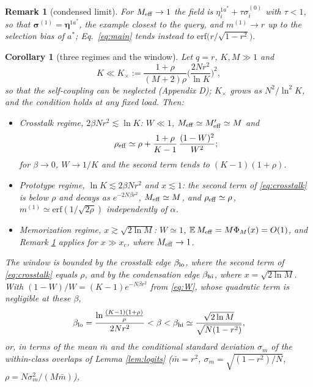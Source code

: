 \documentclass[11pt,a4paper]{article}
\newtheorem{corollary}{Corollary}
\newtheorem{remark}{Remark}
\newcommand{\s}{\bm{\sigma}}
\newcommand{\e}{\bm{\eta}}
\newcommand{\E}{\mathbb{E}}
\newcommand{\Meff}{M_{\rm eff}}
\newcommand{\erf}{\mathrm{erf}}
\begin{document}
\begin{remark}[condensed limit]\label{rem:cond}
For $\Meff\to1$ the field is $\eta^{1a^*}_i+\tau\sigma^{(0)}_i$ with $\tau<1$, so that $\s^{(1)}=\e^{1a^*}$, the example closest to the query, and $m^{(1)}\to r$ up to the selection bias of $a^*$; Eq.\ \eqref{eq:main} tends instead to $\erf\big(r/\sqrt{1-r^2}\big)$.
\end{remark}

\begin{corollary}[three regimes and the window]\label{cor:regimes}
Let $q=r$, $K,M\gg1$ and
\begin{equation*}
K\ll K_\times:=\frac{1+\rho}{(M+2)\rho}\Big(\frac{2Nr^2}{\ln K}\Big)^2,
\end{equation*}
so that the self-coupling can be neglected (Appendix D); $K_\times$ grows as $N^2/\ln^2K$, and the condition holds at any fixed load. Then:
\begin{itemize}\setlength\itemsep{1pt}
\item[(i)] \emph{Crosstalk regime}, $2\beta Nr^2\lesssim\ln K$: $W\ll1$, $\Meff\simeq\Meff'\simeq M$ and
\begin{equation}
\rho_{\rm eff}\simeq\rho+\frac{1+\rho}{K-1}\,\frac{(1-W)^2}{W^2};
\label{eq:crosstalk}
\end{equation}
for $\beta\to0$, $W\to1/K$ and the second term tends to $(K-1)(1+\rho)$.
\item[(ii)] \emph{Prototype regime}, $\ln K\lesssim2\beta Nr^2$ and $x\lesssim1$: the second term of \eqref{eq:crosstalk} is below $\rho$ and decays as $e^{-2N\beta r^2}$, $\Meff\simeq M$, and $\rho_{\rm eff}\simeq\rho$, $m^{(1)}\simeq\erf(1/\sqrt{2\rho})$ independently of $\alpha$.
\item[(iii)] \emph{Memorization regime}, $x\gtrsim\sqrt{2\ln M}$: $W\simeq1$, $\E\,\Meff=M\Phi_M(x)=O(1)$, and Remark \ref{rem:cond} applies for $x\gg x_c$, where $\Meff\to1$.
\end{itemize}
The window is bounded by the \emph{crosstalk edge} $\beta_{\rm lo}$, where the second term of \eqref{eq:crosstalk} equals $\rho$, and by the \emph{condensation edge} $\beta_{\rm hi}$, where $x=\sqrt{2\ln M}$. With $(1-W)/W=(K-1)e^{-N\beta r^2}$ from \eqref{eq:W}, whose quadratic term is negligible at these $\beta$,
\begin{equation}
\beta_{\rm lo}=\frac{\ln\frac{(K-1)(1+\rho)}{\rho}}{2Nr^2}<\beta<\beta_{\rm hi}\simeq\frac{\sqrt{2\ln M}}{\sqrt{N(1-r^2)}},
\label{eq:window}
\end{equation}
or, in terms of the mean $\bar m$ and the conditional standard deviation $\sigma_m$ of the within-class overlaps of Lemma \ref{lem:logits} ($\bar m=r^2$, $\sigma_m=\sqrt{(1-r^2)/N}$, $\rho=N\sigma_m^2/(M\bar m)$),

\end{corollary}
\end{document}
